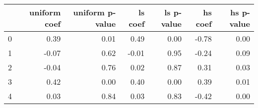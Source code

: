 \begin{tabular}{lrrrrrr}
\toprule
 & uniform coef & uniform p-value & ls coef & ls p-value & hs coef & hs p-value \\
\midrule
0 & 0.39 & 0.01 & 0.49 & 0.00 & -0.78 & 0.00 \\
1 & -0.07 & 0.62 & -0.01 & 0.95 & -0.24 & 0.09 \\
2 & -0.04 & 0.76 & 0.02 & 0.87 & 0.31 & 0.03 \\
3 & 0.42 & 0.00 & 0.40 & 0.00 & 0.39 & 0.01 \\
4 & 0.03 & 0.84 & 0.03 & 0.83 & -0.42 & 0.00 \\
\bottomrule
\end{tabular}
